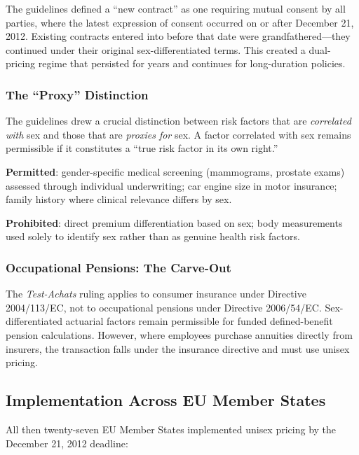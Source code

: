 \documentclass[12pt,a4paper]{article}
\begin{document}
The guidelines defined a ``new contract'' as one requiring mutual consent by all parties, where the latest expression of consent occurred on or after December 21, 2012. Existing contracts entered into before that date were grandfathered---they continued under their original sex-differentiated terms. This created a dual-pricing regime that persisted for years and continues for long-duration policies.

\subsubsection{The ``Proxy'' Distinction}

The guidelines drew a crucial distinction between risk factors that are \emph{correlated with} sex and those that are \emph{proxies for} sex. A factor correlated with sex remains permissible if it constitutes a ``true risk factor in its own right.''

\textbf{Permitted}: gender-specific medical screening (mammograms, prostate exams) assessed through individual underwriting; car engine size in motor insurance; family history where clinical relevance differs by sex.

\textbf{Prohibited}: direct premium differentiation based on sex; body measurements used solely to identify sex rather than as genuine health risk factors.

\subsubsection{Occupational Pensions: The Carve-Out}

The \emph{Test-Achats} ruling applies to consumer insurance under Directive 2004/113/EC, not to occupational pensions under Directive 2006/54/EC. Sex-differentiated actuarial factors remain permissible for funded defined-benefit pension calculations. However, where employees purchase annuities directly from insurers, the transaction falls under the insurance directive and must use unisex pricing.

\subsection{Implementation Across EU Member States}
\label{subsec:implementation}

All then twenty-seven EU Member States implemented unisex pricing by the December 21, 2012 deadline:
\end{document}
